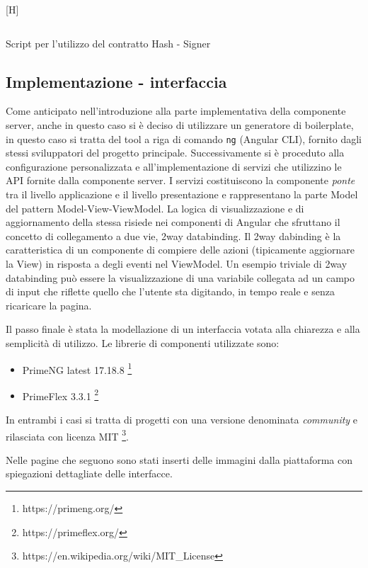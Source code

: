\documentclass[a4paper,11pt]{article}
\newenvironment{longlisting}{\captionsetup{type=figure,labelformat=custom}}{}
\begin{document}
\begin{longlisting}[H]
  \inputminted{typescript}{./code/hash.sign.ts}
  \caption{Script per l'utilizzo del contratto Hash - Signer}
  \label{listing:hash6}
\end{longlisting}


\subsection{Implementazione - interfaccia}

Come anticipato nell'introduzione alla parte implementativa della componente server, anche in questo caso si è deciso di utilizzare un generatore di boilerplate, in questo caso si tratta del tool a riga di comando \texttt{ng} (Angular CLI), fornito dagli stessi sviluppatori del progetto principale. Successivamente si è proceduto alla configurazione personalizzata e all'implementazione di servizi che utilizzino le API fornite dalla componente server. I servizi costituiscono la componente \textit{ponte} tra il livello applicazione e il livello presentazione e rappresentano la parte Model del pattern Model-View-ViewModel. La logica di visualizzazione e di aggiornamento della stessa risiede nei componenti di Angular che sfruttano il concetto di collegamento a due vie, 2way databinding. Il 2way dabinding è la caratteristica di un componente di compiere delle azioni (tipicamente aggiornare la View) in risposta a degli eventi nel ViewModel. Un esempio triviale di 2way databinding può essere la visualizzazione di una variabile collegata ad un campo di input che riflette quello che l'utente sta digitando, in tempo reale e senza ricaricare la pagina.

Il passo finale è stata la modellazione di un interfaccia votata alla chiarezza e alla semplicità di utilizzo. Le librerie di componenti utilizzate sono:

\begin{itemize}
  \item PrimeNG latest 17.18.8 \footnote{https://primeng.org/}
  \item PrimeFlex 3.3.1 \footnote{https://primeflex.org/}
\end{itemize}

In entrambi i casi si tratta di progetti con una versione denominata \textit{community} e rilasciata con licenza MIT \footnote{https://en.wikipedia.org/wiki/MIT\_License}.

Nelle pagine che seguono sono stati inserti delle immagini dalla piattaforma con spiegazioni dettagliate delle interfacce.
\end{document}
